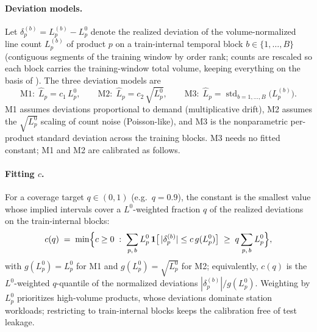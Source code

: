 \paragraph{Deviation models.}
Let $\delta_p^{(b)} = L_p^{(b)} - L^0_p$ denote the realized deviation of
the volume-normalized line count $L_p^{(b)}$ of product $p$ on a
train-internal temporal block $b \in \{1,\dots,B\}$ (contiguous segments of
the training window by order rank; counts are rescaled so each block carries
the training-window total volume, keeping everything on the basis of
). The three deviation models are
\begin{equation}
\text{M1:}\ \ \hat L_p = c_1\, L^0_p,
\qquad
\text{M2:}\ \ \hat L_p = c_2\, \sqrt{L^0_p},
\qquad
\text{M3:}\ \ \hat L_p = \operatorname{std}_{b=1,\dots,B}\bigl(L_p^{(b)}\bigr).
\label{eq:bs-devmodels}
\end{equation}
M1 assumes deviations proportional to demand (multiplicative drift), M2
assumes the $\sqrt{L^0_p}$ scaling of count noise (Poisson-like), and M3
is the nonparametric per-product standard deviation across the training
blocks. M3 needs no fitted constant; M1 and M2 are calibrated as follows.

\paragraph{Fitting $c$.}
For a coverage target $q \in (0,1)$ (e.g.\ $q = 0.9$), the constant is the
smallest value whose implied intervals cover a $L^0$-weighted fraction $q$
of the realized deviations on the train-internal blocks:
\begin{equation}
c(q) \;=\; \min \Bigl\{ c \ge 0 \;:\;
\sum_{p,\,b} L^0_p\, \mathbf 1\bigl[\,|\delta_p^{(b)}| \le c\, g(L^0_p)\bigr]
\;\ge\; q \sum_{p,\,b} L^0_p \Bigr\},
\label{eq:bs-cfit}
\end{equation}
with $g(L^0_p) = L^0_p$ for M1 and $g(L^0_p) = \sqrt{L^0_p}$ for
M2; equivalently, $c(q)$ is the $L^0$-weighted $q$-quantile of the
normalized deviations $|\delta_p^{(b)}| / g(L^0_p)$. Weighting by
$L^0_p$ prioritizes high-volume products, whose deviations dominate
station workloads; restricting to train-internal blocks keeps the calibration
free of test leakage.

